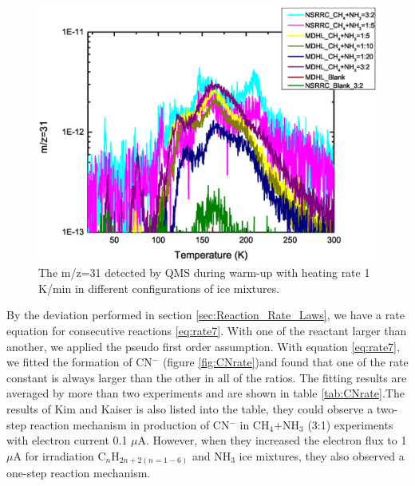 \begin{figure}
\centering
\includegraphics[width=\textwidth]{figures/chapter3/Mass31.eps}
\caption{The m/z=31 detected by QMS during warm-up with heating rate 1 K/min in different configurations of ice mixtures.}
\label{Mass31}
\end{figure}

By the deviation performed in section \ref{sec:Reaction_Rate_Laws}, we have a rate equation for consecutive reactions \ref{eq:rate7}. With one of the reactant larger than another, we applied the pseudo first order assumption. With equation \ref{eq:rate7}, we fitted the formation of CN$^-$ (figure \ref{fig:CNrate})and found that one of the rate constant is always larger than the other in all of the ratios. The fitting results are averaged by more than two experiments and are shown in table \ref{tab:CNrate}.The results of Kim and Kaiser is also listed into the table, they could observe a two-step reaction mechanism in production of CN$^-$ in CH$_4$+NH$_3$ (3:1) experiments with electron current 0.1 $\mu$A. However, when they increased the electron flux to 1 $\mu$A for irradiation C$_n$H$_{2n+2 (n=1-6)}$ and NH$_3$ ice mixtures, they also observed a one-step reaction mechanism.

